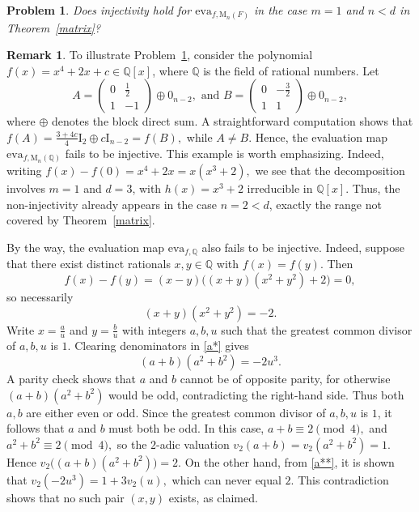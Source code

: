\documentclass{amsart}
\newtheorem{open}[theorem]{Problem}
\theoremstyle{definition}
\newtheorem{remark}[theorem]{Remark}%
\begin{document}
	\begin{open}\label{open1}
		Does injectivity hold for $\mathrm{eva}_{f,\mathrm{M}_n(F)}$ in the case $m=1$ and $n<d$ in Theorem~\ref{matrix}?
	\end{open}
	
	
	\begin{remark}\label{remark2}
		To illustrate Problem~\ref{open1}, consider the polynomial $f(x)=x^4+2x+c \in \mathbb{Q}[x]$, where $\mathbb{Q}$ is the field of rational numbers. Let $$A=\begin{pmatrix}0&\tfrac{1}{2}\\[2pt] 1&-1\end{pmatrix}\oplus 0_{n-2},\text{ and }B=\begin{pmatrix}0&-\tfrac{3}{2}\\[2pt] 1&1\end{pmatrix}\oplus 0_{n-2},$$
		where \(\oplus\) denotes the block direct sum. A straightforward computation 
		shows that $f(A)=\frac{3+4c}{4}\mathrm{I}_2 \oplus c\mathrm{I}_{n-2}
		= f(B),$
		while \(A\neq B\). Hence, the evaluation map $\mathrm{eva}_{f,\mathrm{M}_n(\mathbb{Q})}$ fails to be injective.  	This example is worth emphasizing. Indeed, writing $f(x)-f(0)=x^4+2x = x(x^3+2),$
		we see that the decomposition involves \(m=1\) and \(d=3\), with 
		\(h(x)=x^3+2\) irreducible in \(\mathbb{Q}[x]\). Thus, the non-injectivity 
		already appears in the case \(n=2<d\), exactly the range not covered by 
		Theorem~\ref{matrix}.
		
		By the way, the evaluation map $\mathrm{eva}_{f,\mathbb{Q}}$ also fails to be injective.  Indeed, suppose that there exist distinct rationals $x,y\in\mathbb{Q}$ with $f(x)=f(y)$. Then 
		\[
		f(x)-f(y)=(x-y)\big((x+y)(x^2+y^2)+2\big)=0,
		\]
		so necessarily
		\begin{equation}
			(x+y)(x^2+y^2)=-2. \label{a*}
		\end{equation}	Write $x=\frac{a}{u}$ and $y=\frac{b}{u}$ with integers $a,b,u$ such that the greatest common divisor of $a,b,u$ is $1$. 
		Clearing denominators in \eqref{a*} gives
		\begin{equation}
			(a+b)(a^2+b^2)=-2u^3. \label{a**}
		\end{equation}	A parity check shows that $a$ and $b$ cannot be of opposite parity, 
		for otherwise $(a+b)(a^2+b^2)$ would be odd, contradicting the right-hand side. 
		Thus both $a,b$ are either even or odd. Since the greatest common divisor of $a,b,u$ is $1$, it follows that $a$ and $b$ must both be odd.	 In this case, $a+b \equiv 2 \pmod{4},$ and $a^2+b^2 \equiv 2 \pmod{4},$
		so the $2$-adic valuation $v_2(a+b)=v_2(a^2+b^2)=1$. Hence $v_2\!\big((a+b)(a^2+b^2)\big)=2.$	On the other hand, from \eqref{a**}, it is shown that
		$v_2(-2u^3)=1+3v_2(u),$
		which can never equal $2$. This contradiction shows that no such pair $(x,y)$ exists, as claimed.
	\end{remark}
	
\end{document}
